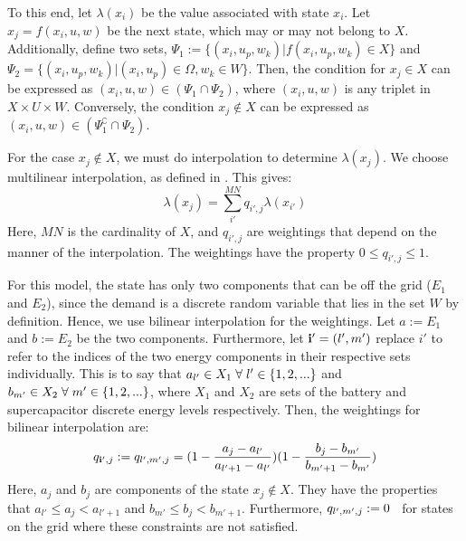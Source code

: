 \documentclass[conference]{IEEEtran}
\begin{document}
To this end, let $\lambda(x_{i})$ be the value associated with state $x_{i}$. Let $x_{j}=f(x_{i}, u, w)$ be the next state, which may or may not belong to $X$. Additionally, define two sets, $\Psi_{1}:=\{(x_{i}, u_{p}, w_{k})|f(x_{i}, u_{p}, w_{k})\in X\}$ and $\Psi_{2}=\{(x_{i}, u_{p}, w_{k})|(x_{i}, u_{p})\in\Omega, w_{k}\in W\}$. Then, the condition for $x_{j}\in X$ can be expressed as $(x_{i}, u, w) \in (\Psi_{1}\cap\Psi_{2})$, where $(x_{i}, u, w)$ is any triplet in $X\times U \times W$. Conversely, the condition $x_{j} \not\in X$ can be expressed as $(x_{i}, u, w) \in (\Psi_{1}^\complement\cap\Psi_{2})$.

For the case $x_{j}\not\in X$, we must do interpolation to determine $\lambda(x_{j})$. We choose multilinear interpolation, as defined in \cite{715376}. This gives:
\begin{displaymath}
	\lambda(x_{j})=\sum_{i'}^{MN}q_{i',j}\lambda(x_{i'})
\end{displaymath} Here, $MN$ is the cardinality of $X$, and $q_{i',j}$ are weightings that depend on the manner of the interpolation. The weightings have the property $0\leq q_{i',j}\leq 1$.

For this model, the state has only two components that can be off the grid ($E_{1}$ and $E_{2}$), since the demand is a discrete random variable that lies in the set $W$ by definition. Hence, we use bilinear interpolation for the weightings. Let $a:=E_{1}$ and $b:=E_{2}$ be the two components. Furthermore, let $\bold{i'}=(l',m')$ replace $i'$ to refer to the indices of the two energy components in their respective sets individually. This is to say that $a_{l'}\in X_{1}\hspace{0.1cm}\forall\hspace{0.1cm}l'\in\{1,2,...\}$ and $b_{m'}\in X_{2}\hspace{0.1cm}\forall\hspace{0.1cm} m'\in\{1,2,...\}$, where $X_{1}$ and $X_{2}$ are sets of the battery and supercapacitor discrete energy levels respectively. %
Then, the weightings for bilinear interpolation are:
\begin{displaymath}
    q_{\bold{i'},j}:=q_{l',m',j}=(1-\frac{a_{j}-a_{l'}}{a_{l'+1}-a_{l'}})(1-\frac{b_{j}-b_{m'}}{b_{m'+1}-b_{m'}})
\end{displaymath} Here, $a_{j}$ and $b_{j}$ are components of the state $x_{j}\not\in X$. They have the properties that $a_{l'}\leq a_{j}< a_{l'+1}$ and $b_{m'}\leq b_{j}< b_{m'+1}$. Furthermore, $q_{l',m',j}:=0\hspace{0.2cm}$ for states on the grid where these constraints are not satisfied.
\end{document}
